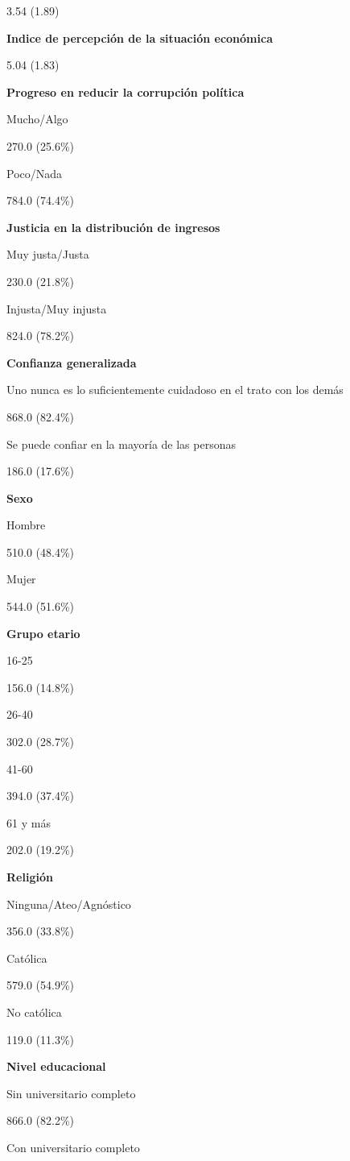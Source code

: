 \documentclass[12pt,twoside]{templates/facsothesis}
\begin{document}
3.54 (1.89)

\textbf{Indice de percepción de la situación económica}

5.04 (1.83)

\textbf{Progreso en reducir la corrupción política}

Mucho/Algo

270.0 (25.6\%)

Poco/Nada

784.0 (74.4\%)

\textbf{Justicia en la distribución de ingresos}

Muy justa/Justa

230.0 (21.8\%)

Injusta/Muy injusta

824.0 (78.2\%)

\textbf{Confianza generalizada}

Uno nunca es lo suficientemente cuidadoso en el trato con los demás

868.0 (82.4\%)

Se puede confiar en la mayoría de las personas

186.0 (17.6\%)

\textbf{Sexo}

Hombre

510.0 (48.4\%)

Mujer

544.0 (51.6\%)

\textbf{Grupo etario}

16-25

156.0 (14.8\%)

26-40

302.0 (28.7\%)

41-60

394.0 (37.4\%)

61 y más

202.0 (19.2\%)

\textbf{Religión}

Ninguna/Ateo/Agnóstico

356.0 (33.8\%)

Católica

579.0 (54.9\%)

No católica

119.0 (11.3\%)

\textbf{Nivel educacional}

Sin universitario completo

866.0 (82.2\%)

Con universitario completo
\end{document}
